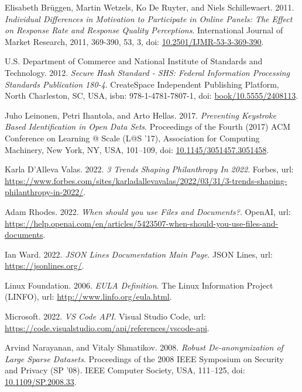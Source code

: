 \begin{thebibliography}{99}
 Elisabeth Brüggen, Martin Wetzels, Ko De Ruyter, and Niels Schillewaert. 2011. \textit{Individual Differences in Motivation to Participate in Online Panels: The Effect on Response Rate and Response Quality Perceptions}. International Journal of Market Research, 2011, 369-390, 53, 3, doi: \href{https://doi.org/10.2501/IJMR-53-3-369-390}{10.2501/IJMR-53-3-369-390}.

 U.S. Department of Commerce and National Institute of Standards and Technology. 2012. \textit{Secure Hash Standard - SHS: Federal Information Processing Standards Publication 180-4}. CreateSpace Independent Publishing Platform, North Charleston, SC, USA, isbn: 978-1-4781-7807-1, doi: \href{https://dl.acm.org/doi/book/10.5555/2408113}{book/10.5555/2408113}.

 Juho Leinonen, Petri Ihantola, and Arto Hellas. 2017. \textit{Preventing Keystroke Based Identification in Open Data Sets}. Proceedings of the Fourth (2017) ACM Conference on Learning @ Scale (L@S '17), Association for Computing Machinery, New York, NY, USA, 101–109, doi: \href{https://doi.org/10.1145/3051457.3051458}{10.1145/3051457.3051458}.

 Karla D’Alleva Valas. 2022. \textit{3 Trends Shaping Philanthropy In 2022}. Forbes, url: \url{https://www.forbes.com/sites/karladallevavalas/2022/03/31/3-trends-shaping-philanthropy-in-2022/}.

 Adam Rhodes. 2022. \textit{When should you use Files and Documents?}. OpenAI, url: \url{https://help.openai.com/en/articles/5423507-when-should-you-use-files-and-documents}.

 Ian Ward. 2022. \textit{JSON Lines Documentation Main Page}. JSON Lines, url: \url{https://jsonlines.org/}.

 Linux Foundation. 2006. \textit{EULA Definition}. The Linux Information Project (LINFO), url: \url{http://www.linfo.org/eula.html}.

 Microsoft. 2022. \textit{VS Code API}. Visual Studio Code, url: \url{https://code.visualstudio.com/api/references/vscode-api}.

 Arvind Narayanan, and Vitaly Shmatikov. 2008. \textit{Robust De-anonymization of Large Sparse Datasets}. Proceedings of the 2008 IEEE Symposium on Security and Privacy (SP '08). IEEE Computer Society, USA, 111–125, doi: \href{https://doi.org/10.1109/SP.2008.33}{10.1109/SP.2008.33}.


\end{thebibliography}
